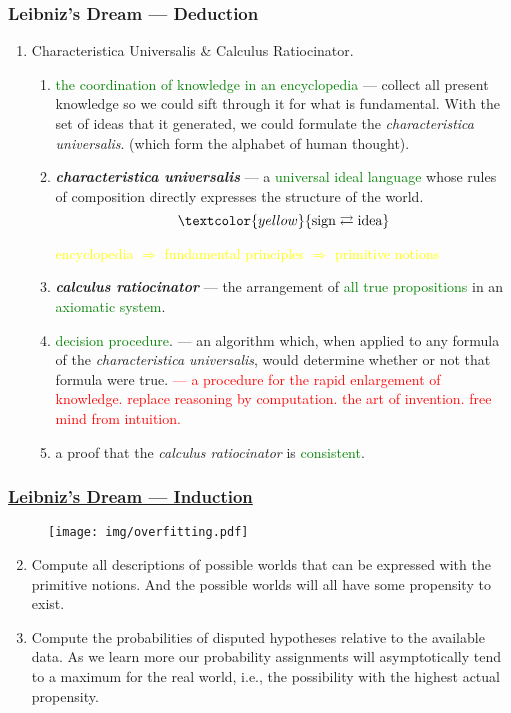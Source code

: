\documentclass[UTF8,aspectratio=43,11pt,colorlinks,compress,openany]{beamer}%
\begin{document}
\begin{frame}\frametitle{Leibniz's Dream --- Deduction}
		\begin{enumerate}[1]
			\item Characteristica Universalis \& Calculus Ratiocinator.
			\begin{enumerate}[i]
				\item \textcolor{green}{the coordination of knowledge in an encyclopedia} --- collect all present knowledge so we could sift through it for what is fundamental. With the set of ideas that it generated, we could formulate the \emph{characteristica universalis}. (which form the alphabet of human thought).
				\item \emph{\textbf{characteristica universalis}} --- a \textcolor{green}{universal ideal language} whose rules of composition directly expresses the structure of the world.
					\[\textcolor{yellow}{\text{sign}\rightleftarrows\text{idea}}\]
					\begin{center}
						{\footnotesize \textcolor{yellow}{
								encyclopedia $\Rightarrow$ fundamental principles $\Rightarrow$ primitive notions}}
					\end{center}
				\item \emph{\textbf{calculus ratiocinator}} --- the arrangement of \textcolor{green}{all true propositions} in an \textcolor{green}{axiomatic system}.
				\item \textcolor{green}{decision procedure}. --- an algorithm which, when applied to any formula of the \emph{characteristica universalis}, would determine whether or not that formula were true. \textcolor{red}{--- a procedure for the rapid enlargement of knowledge. replace reasoning by computation. the art of invention. free mind from intuition.}
				\item a proof that the \emph{calculus ratiocinator} is \textcolor{green}{consistent}.
			\end{enumerate}
		\end{enumerate}
\end{frame}

\begin{frame}\frametitle{\href{https://philpapers.org/rec/HACTLP}{Leibniz's Dream --- Induction}}
		\begin{figure}
			\texttt{[image: img/overfitting.pdf]}
		\end{figure}
		\vspace{-7pt}
		\begin{enumerate}\setcounter{enumi}{1}
			\item Compute all descriptions of possible worlds that can be expressed with the primitive notions. And the possible worlds will all have some propensity to exist.
			\item Compute the probabilities of disputed hypotheses relative to the available data. As we learn more our probability assignments will asymptotically tend to a maximum for the real world, i.e., the possibility with the highest actual propensity.
		\end{enumerate}
\end{frame}
\end{document}

